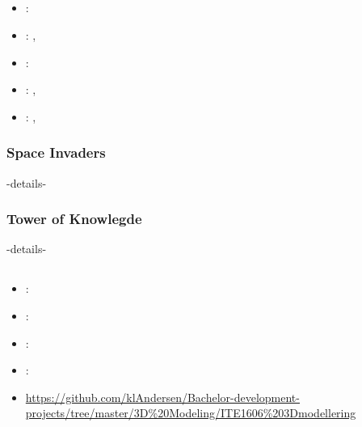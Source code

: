 \subsection[Flash Programming]{}
\label{sec:flash_prog}
\begin{itemize} 
\item {}: 
\item {}: , 
\item {}: 
\item {}: , 
\item {}: , 
\end{itemize} 

\subsubsection{Space Invaders}
\label{sec:space_invaders}
-details-

\subsubsection{Tower of Knowlegde}
\label{sec:tower_of_knowledge}
-details-

\subsection[3D Modelling]{}
\label{sec:ite1606_3d_modelling}
\begin{itemize} 
	\item {}: 
	\item {}: 
	\item {}: 
	\item {}: 
	\item {} \url{https://github.com/klAndersen/Bachelor-development-projects/tree/master/3D%20Modeling/ITE1606%203Dmodellering}
\end{itemize} 

